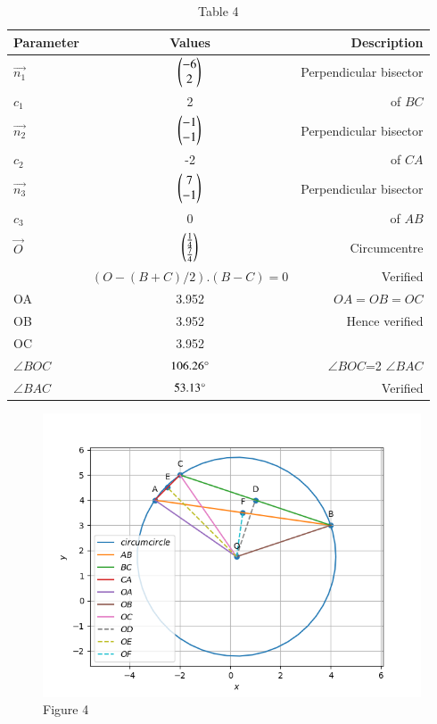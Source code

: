 \documentclass[journal,12pt,twocolumn]{IEEEtran}
\theoremstyle{remark}
\begin{document}
\begin{table}[h!]
 \begin{center}
  \caption{Table 4}
  \label{tab: table4}
\begin{tabular}{|l|c|r|}
     \hline
    Parameter & Values & Description\\
     \hline
     $\vec{n_1}$ & $\begin{pmatrix}-6\\2\\\end{pmatrix}$ & Perpendicular bisector\\
     ${c_1}$ & 2 & of $BC$\\
     $\vec{n_2}$ & $\begin{pmatrix}-1\\-1\\\end{pmatrix}$ & Perpendicular bisector\\
     ${c_2}$ & -2 & of $CA$\\
     $\vec{n_3}$ & $\begin{pmatrix}7\\-1\\\end{pmatrix}$ & Perpendicular bisector\\
     ${c_3}$ & 0 & of $AB$\\
     \hline
     $\vec O$ & $\begin{pmatrix}\frac{1}{4}\\\frac{7}{4}\\\end{pmatrix}$ & Circumcentre\\
     \hline
     {} & $(O-(B+C)/2).(B-C)=0$ & Verified\\
     \hline
     OA & 3.952 & $OA=OB=OC$\\
     OB & 3.952 & Hence verified\\
     OC & 3.952 & {}\\
     \hline
     $\angle BOC$ & $106.26\degree$ & $\angle BOC$=2 $\angle BAC$\\
     $\angle BAC$ & $53.13\degree$  & Verified\\
     \hline
\end{tabular}
\end{center}
\end{table}
\begin{figure}[h!]
\centering

\includegraphics[width=\columnwidth] {./figs/fig20.png}
\caption{ Figure 4}
\label{fig: Perpendicular bisectors}

\end{figure}
\end{document}
